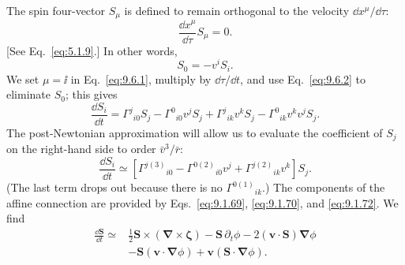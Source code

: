 The spin four-vector \(S_\mu\) is defined to remain orthogonal to the
velocity \(\dd x^\mu/\dd\tau\):
\[
  \frac{\dd x^\mu}{\dd\tau}S_\mu=0.
\]
[See Eq.~\eqref{eq:5.1.9}.] In other words,
\begin{equation}
  S_0=-v^iS_i.
  \tag{9.6.2}\label{eq:9.6.2}
\end{equation}
We set \(\mu=\ii\) in Eq.~\eqref{eq:9.6.1}, multiply by
\(\dd\tau/\dd t\), and use Eq.~\eqref{eq:9.6.2} to eliminate \(S_0\);
this gives
\begin{equation}
  \frac{\dd S_i}{\dd t}
  =
  \Gamma^j{}_{i0}S_j
  {}-\Gamma^0{}_{i0}v^jS_j
  {}+\Gamma^j{}_{ik}v^kS_j
  {}-\Gamma^0{}_{ik}v^kv^jS_j.
  \tag{9.6.3}\label{eq:9.6.3}
\end{equation}
The post-Newtonian approximation will allow us to evaluate the coefficient
of \(S_j\) on the right-hand side to order \(\bar v^3/\bar r\):
\begin{equation}
  \frac{\dd S_i}{\dd t}
  \simeq
  \left[
    \Gamma^{j(3)}{}_{i0}
    {}-\Gamma^{0(2)}{}_{i0}v^j
    {}+\Gamma^{j(2)}{}_{ik}v^k
  \right]S_j.
  \tag{9.6.4}\label{eq:9.6.4}
\end{equation}
(The last term drops out because there is no
\(\Gamma^{0(1)}{}_{ik}\).) The components of the affine connection are
provided by Eqs.~\eqref{eq:9.1.69}, \eqref{eq:9.1.70}, and
\eqref{eq:9.1.72}. We find
\begin{equation}
  \begin{split}
  \frac{\dd\mathbf S}{\dd t}\simeq{}&
  \frac12\mathbf S\times
    (\boldsymbol\nabla\times\boldsymbol\zeta)
  -\mathbf S\,\partial_t\phi
  -2(\mathbf v\cdot\mathbf S)\boldsymbol\nabla\phi\\
  &-\mathbf S(\mathbf v\cdot\boldsymbol\nabla\phi)
  +\mathbf v(\mathbf S\cdot\boldsymbol\nabla\phi).
  \end{split}
  \tag{9.6.5}\label{eq:9.6.5}
\end{equation}

